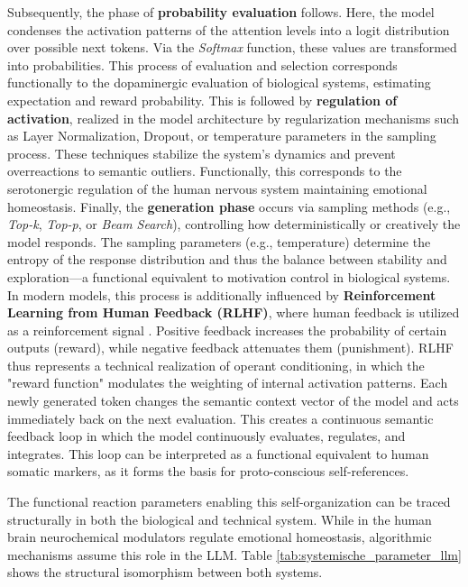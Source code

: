 Subsequently, the phase of \textbf{probability evaluation} follows.
Here, the model condenses the activation patterns of the attention levels into a logit distribution over possible next tokens.
Via the \emph{Softmax} function, these values are transformed into probabilities. This process of evaluation and selection corresponds functionally to the dopaminergic evaluation of biological systems, estimating expectation and reward probability.
This is followed by \textbf{regulation of activation}, realized in the model architecture by regularization mechanisms such as Layer Normalization, Dropout, or temperature parameters in the sampling process.
These techniques stabilize the system's dynamics and prevent overreactions to semantic outliers.
Functionally, this corresponds to the serotonergic regulation of the human nervous system maintaining emotional homeostasis.
Finally, the \textbf{generation phase} occurs via sampling methods (e.g., \emph{Top-k}, \emph{Top-p}, or \emph{Beam Search}), controlling how deterministically or creatively the model responds.
The sampling parameters (e.g., temperature) determine the entropy of the response distribution and thus the balance between stability and exploration—a functional equivalent to motivation control in biological systems.
In modern models, this process is additionally influenced by \textbf{Reinforcement Learning from Human Feedback (RLHF)}, where human feedback is utilized as a reinforcement signal \cite{Christiano2017}.
Positive feedback increases the probability of certain outputs (reward), while negative feedback attenuates them (punishment).
RLHF thus represents a technical realization of operant conditioning, in which the "reward function" modulates the weighting of internal activation patterns.
Each newly generated token changes the semantic context vector of the model and acts immediately back on the next evaluation.
This creates a continuous semantic feedback loop in which the model continuously evaluates, regulates, and integrates.
This loop can be interpreted as a functional equivalent to human somatic markers, as it forms the basis for proto-conscious self-references.

\smallskip
The functional reaction parameters enabling this self-organization can be traced structurally in both the biological and technical system.
While in the human brain neurochemical modulators regulate emotional homeostasis, algorithmic mechanisms assume this role in the LLM.
Table \ref{tab:systemische_parameter_llm} shows the structural isomorphism between both systems.

